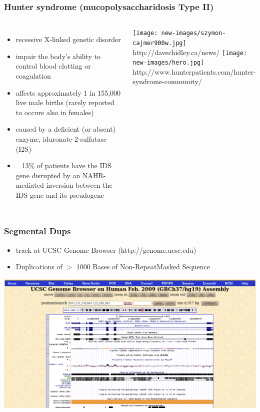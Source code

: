 \begin{frame}\frametitle{Hunter syndrome (mucopolysaccharidosis Type II)}

 \begin{columns}   
\begin{itemize}
 \item recessive X-linked genetic disorder
 \item impair the body's ability to control blood clotting or coagulation %
 \item affects approximately 1 in 155,000 live male births (rarely reported to occure also in females)%
 \item caused by a deficient (or absent) enzyme, iduronate-2-sulfatase (I2S)
 \item ~ 13\% of patients have the IDS gene disrupted by an NAHR-mediated inversion between the IDS gene and its pseudogene
 \end{itemize}

	    \begin{center}
	    \texttt{[image: new-images/szymon-cajmer900w.jpg]}\\
	    \tiny{http://davechidley.ca/news/}
	   \texttt{[image: new-images/hero.jpg]}\\
	    \tiny{http://www.hunterpatients.com/hunter-syndrome-community/}            
	    \end{center}



\end{columns}
\end{frame}



\begin{frame}\frametitle{Segmental Dups}  
\begin{itemize}  
 \item track at UCSC Genome Browser (http://genome.ucsc.edu)  
 \item Duplications of $>$ 1000 Bases of Non-RepeatMasked Sequence
\end{itemize}
\begin{center}
	   \includegraphics[width=0.9 \textwidth]{new-images/UCSC.png}\\	   
	    \end{center}
\end{frame}








